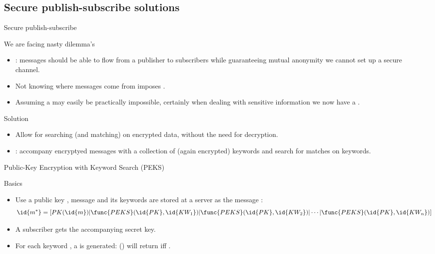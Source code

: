 \subsection{Secure publish-subscribe solutions}
\begin{slide}{Secure publish-subscribe}
  \begin{alertblock}{We are facing nasty dilemma's}
    \begin{itemize}
    \item {}: messages should be able to flow from a publisher to subscribers while
      guaranteeing mutual anonymity \mathexpr{\Rightarrow} we cannot set up a secure channel.
    \item Not knowing where messages come from imposes .
    \item Assuming a  may easily be practically impossible, certainly when dealing with
      sensitive information \mathexpr{\Rightarrow} we now have a .
    \end{itemize}
  \end{alertblock}
  \begin{block}{Solution}
    \begin{itemize}
    \item Allow for searching (and matching) on encrypted data, without the need for decryption.
    \item {}: accompany encryptyed messages with a collection of (again encrypted) keywords and
      search for matches on keywords.
    \end{itemize}
  \end{block}
\end{slide}
\begin{slide}{Public-Key Encryption with Keyword Search (PEKS)}
  \begin{block}{Basics}
    \begin{itemize}
    \item Use a public key , message  and its  keywords
       are stored at a server as the message :
      \[
      \id{m^*} = [ PK(\id{m}) | \func{PEKS}(\id{PK}, \id{KW_1}) | \func{PEKS}(\id{PK}, \id{KW_2}) | \cdots |
        \func{PEKS}(\id{PK}, \id{KW_n}) ]
      \]
    \item A subscriber gets the accompanying secret key.
    \item For each keyword , a   is generated: () will
      return  iff .
    \end{itemize}
  \end{block}
  \begin{centerfig}
     \\
    {\footnotesize {}}
  \end{centerfig}
\end{slide}
